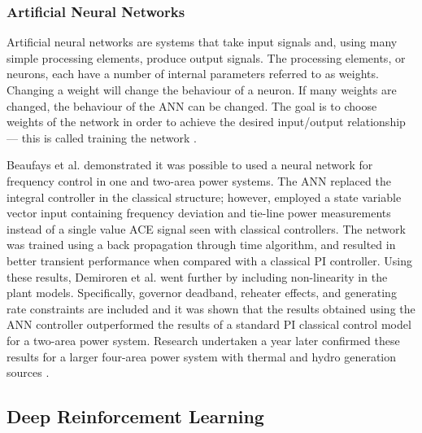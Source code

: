 \subsubsection{Artificial Neural Networks}
Artificial neural networks are systems that take input signals and, using many simple processing elements, produce output signals. The processing elements, or neurons, each have a number of internal parameters referred to as weights. Changing a weight will change the behaviour of a neuron. If many weights are changed, the behaviour of the ANN can be changed. The goal is to choose weights of the network in order to achieve the desired input/output relationship --- this is called training the network \cite{Nguyen1990}.

Beaufays et al. \cite{Beaufays1994} demonstrated it was possible to used a neural network for frequency control in one and two-area power systems. The ANN replaced the integral controller in the classical structure; however, employed a state variable vector input containing frequency deviation and tie-line power measurements instead of a single value ACE signal seen with classical controllers. The network was trained using a back propagation through time algorithm, and resulted in better transient performance when compared with a classical PI controller. Using these results, Demiroren et al. \cite{Demiroren2001} went further by including non-linearity in the plant models. Specifically, governor deadband, reheater effects, and generating rate constraints are included and it was shown that the results obtained using the ANN controller outperformed the results of a standard PI classical control model for a two-area power system. Research undertaken a year later confirmed these results for a larger four-area power system with thermal and hydro generation sources \cite{Zeynelgil2002}. 


\subsection{Deep Reinforcement Learning}
